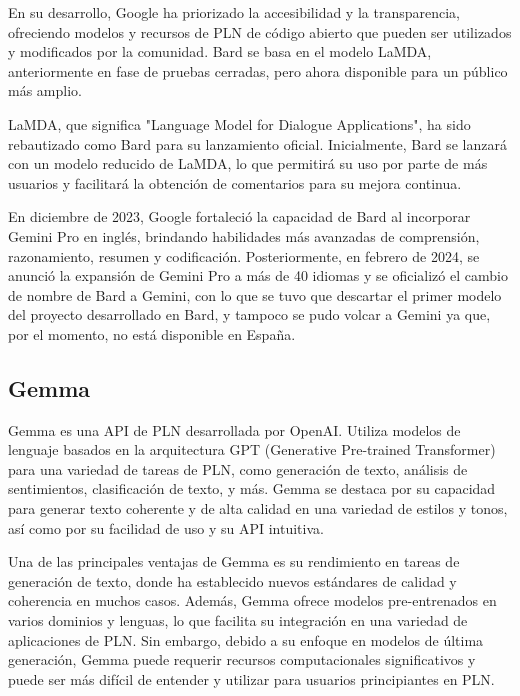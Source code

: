 En su desarrollo, Google ha priorizado la accesibilidad y la transparencia, ofreciendo modelos y recursos de PLN de código abierto que pueden ser utilizados y modificados por la comunidad. Bard se basa en el modelo LaMDA, anteriormente en fase de pruebas cerradas, pero ahora disponible para un público más amplio.

LaMDA, que significa "Language Model for Dialogue Applications", ha sido rebautizado como Bard para su lanzamiento oficial. Inicialmente, Bard se lanzará con un modelo reducido de LaMDA, lo que permitirá su uso por parte de más usuarios y facilitará la obtención de comentarios para su mejora continua.

En diciembre de 2023, Google fortaleció la capacidad de Bard al incorporar Gemini Pro en inglés, brindando habilidades más avanzadas de comprensión, razonamiento, resumen y codificación. Posteriormente, en febrero de 2024, se anunció la expansión de Gemini Pro a más de 40 idiomas y se oficializó el cambio de nombre de Bard a Gemini, con lo que se tuvo que descartar el primer modelo del proyecto desarrollado en Bard, y tampoco se pudo volcar a Gemini ya que, por el momento, no está disponible en España. 
\subsection{Gemma}

Gemma es una API de PLN desarrollada por OpenAI. Utiliza modelos de lenguaje basados en la arquitectura GPT (Generative Pre-trained Transformer) para una variedad de tareas de PLN, como generación de texto, análisis de sentimientos, clasificación de texto, y más. Gemma se destaca por su capacidad para generar texto coherente y de alta calidad en una variedad de estilos y tonos, así como por su facilidad de uso y su API intuitiva.

Una de las principales ventajas de Gemma es su rendimiento en tareas de generación de texto, donde ha establecido nuevos estándares de calidad y coherencia en muchos casos. Además, Gemma ofrece modelos pre-entrenados en varios dominios y lenguas, lo que facilita su integración en una variedad de aplicaciones de PLN. Sin embargo, debido a su enfoque en modelos de última generación, Gemma puede requerir recursos computacionales significativos y puede ser más difícil de entender y utilizar para usuarios principiantes en PLN.


